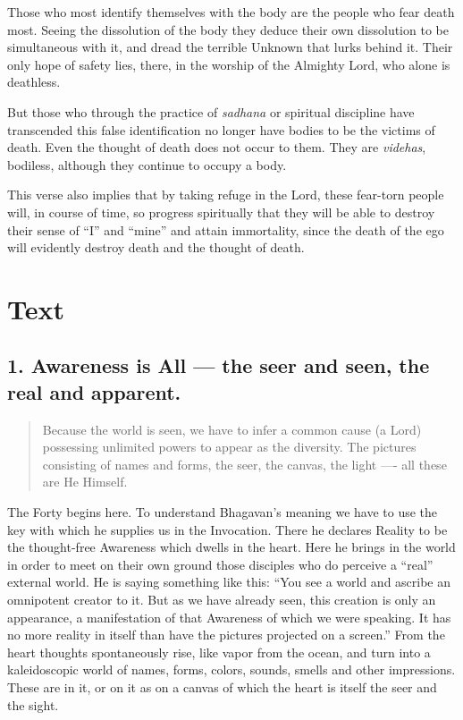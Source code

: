\documentclass[12pt]{report}
\begin{document}
Those who most identify themselves with the body are the people who
fear death most. Seeing the dissolution of the body they deduce their
own dissolution to be simultaneous with it, and dread the terrible
Unknown that lurks behind it. Their only hope of safety lies, there,
in the worship of the Almighty Lord, who alone is deathless.

But those who through the practice of \emph{sadhana} or spiritual
discipline have transcended this false identification no longer have
bodies to be the victims of death. Even the thought of death does not
occur to them. They are \emph{videhas}, bodiless, although they
continue to occupy a body.

This verse also implies that by taking refuge in the Lord, these
fear-torn people will, in course of time, so progress spiritually that
they will be able to destroy their sense of ``I'' and ``mine'' and
attain immortality, since the death of the ego will evidently destroy
death and the thought of death.

\chapter{Text}


\section{1. Awareness is All --- the seer and seen, the real and apparent.}

\begin{quote}
  Because the world is seen, we have to infer a common cause (a Lord)
  possessing unlimited powers to appear as the diversity. The pictures
  consisting of names and forms, the seer, the canvas, the light ----
  all these are He Himself.
\end{quote}


The Forty begins here. To understand Bhagavan's meaning we have to use
the key with which he supplies us in the Invocation. There he declares
Reality to be the thought-free Awareness which dwells in the
heart. Here he brings in the world in order to meet on their own
ground those disciples who do perceive a ``real'' external world. He
is saying something like this: ``You see a world and ascribe an
omnipotent creator to it. But as we have already seen, this creation
is only an appearance, a manifestation of that Awareness of which we
were speaking. It has no more reality in itself than have the pictures
projected on a screen.'' From the heart thoughts spontaneously rise,
like vapor from the ocean, and turn into a kaleidoscopic world of
names, forms, colors, sounds, smells and other impressions. These are
in it, or on it as on a canvas of which the heart is itself the seer
and the sight.
\end{document}
